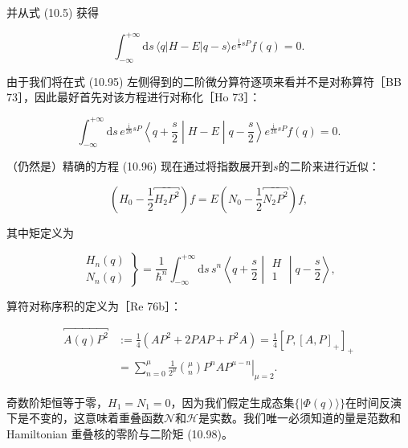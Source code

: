 并从式 (10.5) 获得

\begin{equation}
\int^{+\infty}_{-\infty}\mathrm{d}s\,\langle q|H-E|q-s\rangle e^{\frac{\mathrm{i}}{\hbar}sP}f(q)=0.\label{eq:10.95}
\end{equation}

由于我们将在式 (10.95) 左侧得到的二阶微分算符逐项来看并不是对称算符［BB 73］，因此最好首先对该方程进行对称化［Ho 73］：

\begin{equation}
\int^{+\infty}_{-\infty}\mathrm{d}s\,e^{\frac{\mathrm{i}}{2\hbar}sP}\left\langle q+\frac{s}{2}\middle|H-E\middle|q-\frac{s}{2}\right\rangle e^{\frac{\mathrm{i}}{2\hbar}sP}f(q)=0.\label{eq:10.96}
\end{equation}

（仍然是）精确的方程 (10.96) 现在通过将指数展开到$s$的二阶来进行近似：

\begin{equation}
\left(H_{0}-\frac{1}{2}\overbracket{H_{2}P^{2}}\right)f=E\left(N_{0}-\frac{1}{2}\overbracket{N_{2}P^{2}}\right)f,\label{eq:10.97}
\end{equation}

其中矩定义为

\begin{equation}
\left.\begin{aligned}H_{n}(q)\\
N_{n}(q)
\end{aligned}
\right\} =\frac{1}{\hbar^{n}}\int^{+\infty}_{-\infty}\mathrm{d}s\,s^{n}\left\langle q+\frac{s}{2}\middle|\begin{matrix}H\\
1
\end{matrix}\middle|q-\frac{s}{2}\right\rangle ,\label{eq:10.98}
\end{equation}

算符对称序积的定义为［Re 76b］：

\begin{align}
\overbracket{A(q)P^{2}} & :=\frac{1}{4}(AP^{2}+2PAP+P^{2}A)=\frac{1}{4}[P,[A,P]_{+}]_{+}\nonumber \\
 & =\left.\sum^{\mu}_{n=0}\frac{1}{2^{\mu}}\binom{\mu}{n}P^{n}AP^{\mu-n}\right|_{\mu=2}.\label{eq:10.99}
\end{align}

奇数阶矩恒等于零，$H_{1}=N_{1}=0$，因为我们假定生成态集$\{|\Phi(q)\rangle\}$在时间反演下是不变的，这意味着重叠函数$\mathscr{N}$和$\mathscr{H}$是实数。我们唯一必须知道的量是范数和
Hamiltonian 重叠核的零阶与二阶矩 (10.98)。

